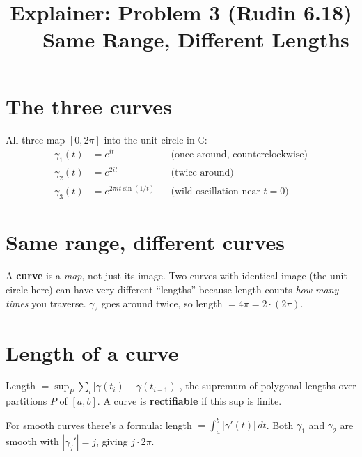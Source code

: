 \documentclass[12pt]{article}
\title{Explainer: Problem 3 (Rudin 6.18) --- Same Range, Different Lengths}
\author{}
\date{}
\begin{document}
\maketitle

\section*{The three curves}
All three map $[0, 2\pi]$ into the unit circle in $\mathbb{C}$:
\begin{align*}
\gamma_1(t) &= e^{it} && \text{(once around, counterclockwise)} \\
\gamma_2(t) &= e^{2it} && \text{(twice around)} \\
\gamma_3(t) &= e^{2\pi i t \sin(1/t)} && \text{(wild oscillation near $t = 0$)}
\end{align*}

\section*{Same range, different curves}
A \textbf{curve} is a \emph{map}, not just its image. Two curves with identical image (the unit circle here) can have very different ``lengths'' because length counts \emph{how many times} you traverse. $\gamma_2$ goes around twice, so length $= 4\pi = 2 \cdot (2\pi)$.

\begin{center}
\end{center}

\section*{Length of a curve}
Length $= \sup_P \sum_{i} |\gamma(t_i) - \gamma(t_{i-1})|$, the supremum of polygonal lengths over partitions $P$ of $[a,b]$. A curve is \textbf{rectifiable} if this sup is finite.

For smooth curves there's a formula: length $= \int_a^b |\gamma'(t)|\, dt$. Both $\gamma_1$ and $\gamma_2$ are smooth with $|\gamma_j'| = j$, giving $j \cdot 2\pi$.
\end{document}
